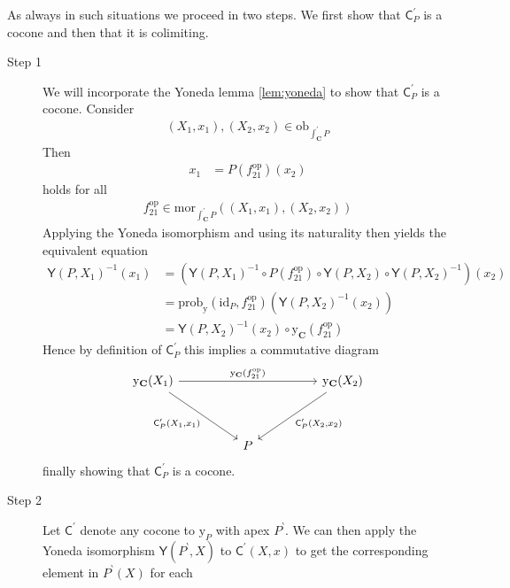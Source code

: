 \begin{prf}
As always in such situations we proceed in two steps. We first show that $\mathsf{C}_{P}^{\prime}$ is a cocone and then that it is colimiting.
\begin{description}
\item[Step 1]
We will incorporate the Yoneda lemma \ref{lem:yoneda} to show that $\mathsf{C}_{P}^{\prime}$ is a cocone. Consider
\begin{align*}
  (X_{1},x_{1}),
  (X_{2},x_{2})
  \in
  \mathrm{ob}_{\int_{\mathbf{C}}^{\prime}P}
\end{align*}
Then
\begin{align*}
  x_{1}
  &=
  P(f_{21}^{\mathrm{op}})(x_{2})
\end{align*}
holds for all
\begin{align*}
  f_{21}^{\mathrm{op}}
  \in
  \mathrm{mor}_{\int_{\mathbf{C}}^{\prime}P}
  \left(
    (X_{1},x_{1}),
    (X_{2},x_{2})
  \right)
\end{align*}
Applying the Yoneda isomorphism and using its naturality then yields the equivalent equation
\begin{align*}
  \mathsf{Y}(P,X_{1})^{-1}(x_{1})
  &=
  \left(
    \mathsf{Y}(P,X_{1})^{-1}
    \circ
    P(f_{21}^{\mathrm{op}})
    \circ
    \mathsf{Y}(P,X_{2})
    \circ
    \mathsf{Y}(P,X_{2})^{-1}
  \right)
  (x_{2})
  \\
  &=
  \mathrm{prob}_{\mathrm{y}}(\mathrm{id}_{P},f_{21}^{\mathrm{op}})
  \left(
    \mathsf{Y}(P,X_{2})^{-1}(x_{2})
  \right)
  \tag{NT}
  \\
  &=
  \mathsf{Y}(P,X_{2})^{-1}(x_{2})
  \circ
  \mathrm{y}_{\mathbf{C}}(f_{21}^{\mathrm{op}})
\end{align*}
Hence by definition of $\mathsf{C}_{P}^{\prime}$ this implies a commutative diagram
\[
\begin{tikzcd}[sep=huge]
  \mathrm{y}_{\mathbf{C}}(X_{1})
  \arrow{rr}{\mathrm{y}_{\mathbf{C}}(f_{21}^{\mathrm{op}})}
  \arrow[swap]{dr}{\mathsf{C}_{P}^{\prime}(X_{1},x_{1})}
  &
  &
  \mathrm{y}_{\mathbf{C}}(X_{2})
  \arrow{dl}{\mathsf{C}_{P}^{\prime}(X_{2},x_{2})}
  \\
  &
  P
  &
\end{tikzcd}
\]
finally showing that $\mathsf{C}_{P}^{\prime}$ is a cocone. 
\\
\item[Step 2]
Let $\mathsf{C}^{\prime}$ denote any cocone to $\mathrm{y}_{P}$ with apex $P^{\backprime}$. We can then apply the Yoneda isomorphism $\mathsf{Y}(P^{\backprime},X)$ to $\mathsf{C}^{\prime}(X,x)$ to get the corresponding element in $P^{\backprime}(X)$ for each

\end{description}
\end{prf}
